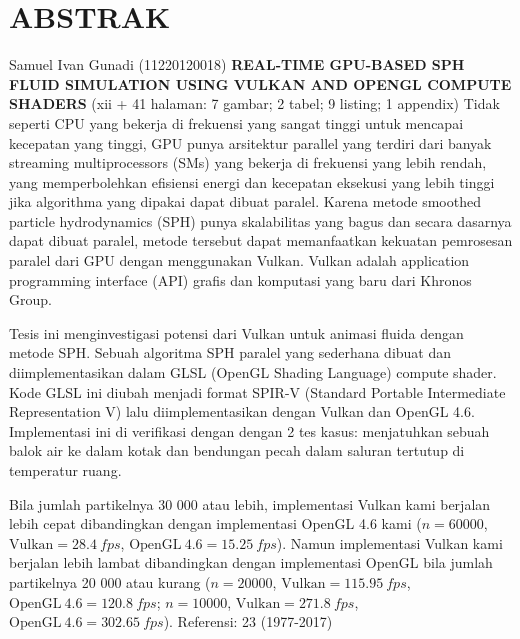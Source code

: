\documentclass[a4paper, 12pt, oneside]{book}
\begin{document}
\clearpage
\chapter{ABSTRAK}

\begin{singlespace}
    Samuel Ivan Gunadi (11220120018)
    \newline
    {\bfseries\large\centering\MakeTextUppercase{Real-Time GPU-Based SPH Fluid Simulation Using Vulkan and OpenGL Compute Shaders}}
    \newline
    (xii + 41 halaman: 7 gambar; 2 tabel; 9 listing; 1 appendix)
    \vspace{1\baselineskip}
    \newline
    Tidak seperti CPU yang bekerja di frekuensi yang sangat tinggi untuk mencapai kecepatan yang tinggi, GPU punya arsitektur parallel yang terdiri dari banyak streaming multiprocessors (SMs) yang bekerja di frekuensi yang lebih rendah, yang memperbolehkan efisiensi energi dan kecepatan eksekusi yang lebih tinggi jika algorithma yang dipakai dapat dibuat paralel. Karena metode smoothed particle hydrodynamics (SPH) punya skalabilitas yang bagus dan secara dasarnya dapat dibuat paralel, metode tersebut dapat memanfaatkan kekuatan pemrosesan paralel dari GPU dengan menggunakan Vulkan. Vulkan adalah application programming interface (API) grafis dan komputasi yang baru dari Khronos Group.
    
    Tesis ini menginvestigasi potensi dari Vulkan untuk animasi fluida dengan metode SPH. Sebuah algoritma SPH paralel yang sederhana dibuat dan diimplementasikan dalam GLSL (OpenGL Shading Language) compute shader. Kode GLSL ini diubah menjadi format SPIR-V (Standard Portable Intermediate Representation V) lalu diimplementasikan dengan Vulkan dan OpenGL 4.6. Implementasi ini di verifikasi dengan dengan 2 tes kasus: menjatuhkan sebuah balok air ke dalam kotak dan bendungan pecah dalam saluran tertutup di temperatur ruang.
    
    Bila jumlah partikelnya 30 000 atau lebih, implementasi Vulkan kami berjalan lebih cepat dibandingkan dengan implementasi OpenGL 4.6 kami (\(n = 60 000\), \(\mathrm{Vulkan} = \SI{28.4}{fps}\), \(\mathrm{OpenGL\ 4.6} = \SI{15.25}{fps}\)). Namun implementasi Vulkan kami berjalan lebih lambat dibandingkan dengan implementasi OpenGL bila jumlah partikelnya 20 000 atau kurang (\(n = 20000\), \(\mathrm{Vulkan} = \SI{115.95}{fps}\), \(\mathrm{OpenGL\ 4.6} = \SI{120.8}{fps}\); \(n = 10000\), \(\mathrm{Vulkan} = \SI{271.8}{fps}\), \(\mathrm{OpenGL\ 4.6} = \SI{302.65}{fps}\)).
    \vspace{1\baselineskip}
    \newline
    Referensi: 23 (1977-2017)
\end{singlespace}
\end{document}
